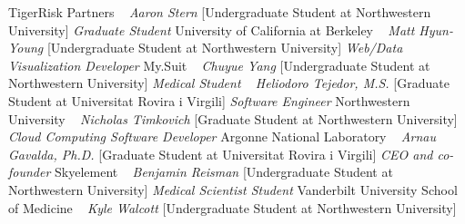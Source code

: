     TigerRisk Partners
    \newline
~
\Gap{}
\textit{Aaron Stern}
    [Undergraduate Student at Northwestern University]
\newline
    \textit{Graduate Student}
    \newline
    University of California at Berkeley
    \newline
~
\Gap{}
\textit{Matt Hyun-Young}
    [Undergraduate Student at Northwestern University]
\newline
    \textit{Web/Data Visualization Developer}
    \newline
    My.Suit
    \newline
~
\Gap{}
\textit{Chuyue Yang}
    [Undergraduate Student at Northwestern University]
\newline
    \textit{Medical Student}
    \newline
~
\Gap{}
\textit{Heliodoro Tejedor, M.S.}
    [Graduate Student at Universitat Rovira i Virgili]
\newline
    \textit{Software Engineer}
    \newline
    Northwestern University
    \newline
~
\Gap{}
\textit{Nicholas Timkovich}
    [Graduate Student at Northwestern University]
\newline
    \textit{Cloud Computing Software Developer}
    \newline
    Argonne National Laboratory
    \newline
~
\Gap{}
\textit{Arnau Gavalda, Ph.D.}
    [Graduate Student at Universitat Rovira i Virgili]
\newline
    \textit{CEO and co-founder}
    \newline
    Skyelement
    \newline
~
\Gap{}
\textit{Benjamin Reisman}
    [Undergraduate Student at Northwestern University]
\newline
    \textit{Medical Scientist Student}
    \newline
    Vanderbilt University School of Medicine
    \newline
~
\Gap{}
\textit{Kyle Walcott}
    [Undergraduate Student at Northwestern University]
\newline
